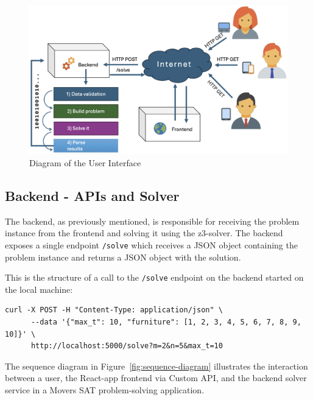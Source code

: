 \documentclass[a4paper, 11pt]{article}
\begin{document}
\begin{figure}[h]
    \centering
    \includegraphics[width=\textwidth]{ ./images/System_Design.png 
}
    \caption{Diagram of the User Interface}
    \label{fig:ui_diagram}
\end{figure}

\subsection{Backend - APIs and Solver}
The backend, as previously mentioned, is responsible for receiving the problem instance from the frontend and solving it using the z3-solver. The backend exposes a single endpoint \texttt{/solve} which receives a JSON object containing the problem instance and returns a JSON object with the solution.

This is the structure of a call to the \texttt{/solve} endpoint on the backend started on the local machine:

\begin{verbatim}
curl -X POST -H "Content-Type: application/json" \
      --data '{"max_t": 10, "furniture": [1, 2, 3, 4, 5, 6, 7, 8, 9, 10]}' \
      http://localhost:5000/solve?m=2&n=5&max_t=10
\end{verbatim}

The sequence diagram in Figure~\ref{fig:sequence-diagram} illustrates the interaction between a user, the React-app frontend via Custom API, and the backend solver service in a Movers SAT problem-solving application.
\end{document}
